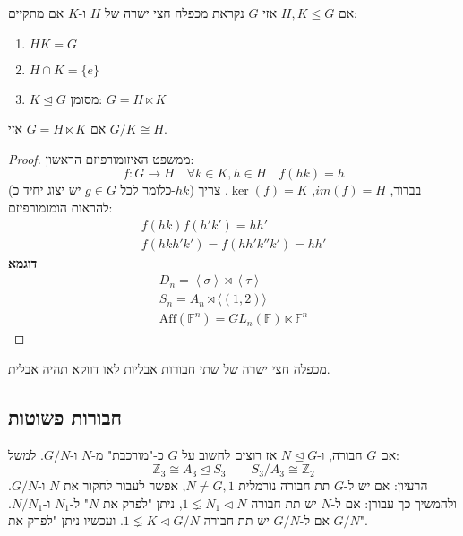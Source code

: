 \documentclass{tstextbook}
\begin{document}
\begin{definition}
אם \(H,K\leq G\) אזי \(G\) נקראת מכפלה חצי ישרה של \(H\) ו-\(K\) אם מתקיים:

  \begin{enumerate}
    \item \(HK=G\)


    \item \(H\cap K=\{ e \}\)


    \item \(K\trianglelefteq G\) 
מסומן: \(G=H\ltimes K\)


  \end{enumerate}
\end{definition}
\begin{proposition}
אם \(G=H\ltimes K\) אזי \(G / K \cong H\).

\end{proposition}
\begin{proof}
ממשפט האיזומורפיזם הראשון:
$$f:G\to H \quad \forall k\in K, h\in H\quad f(hk)=h$$
(כלומר לכל \(g\in G\) יש יצוג יחיד כ-\(hk\)) בברור, \(im(f)=H\), \(\ker(f)=K\). צריך להראות הומומורפיזם: 
$$\begin{gathered}f(hk)f(h'k')=hh'\\f(hkh'k')=f(hh'k''k')=hh'
\end{gathered}$$\textbf{דוגמא}$$\begin{gathered}D_{n}=\left\langle  \sigma \right\rangle\rtimes \left\langle  \tau \right\rangle \\S_{n}=A_{n} \rtimes \langle (1,2)\rangle\\\mathrm{Aff}\left( \mathbb{F}^n  \right)=GL_{n}\left( \mathbb{F} \right)\ltimes \mathbb{F}^n
\end{gathered}$$

\end{proof}
\begin{remark}
מכפלה חצי ישרה של שתי חבורות אבליות לאו דווקא תהיה אבלית.

\end{remark}
\subsection{חבורות פשוטות}

אם \(G\) חבורה, ו-\(N\trianglelefteq G\) אז רוצים לחשוב על \(G\) כ-"מורכבת" מ-\(N\) ו-\(G/N\). למשל:
$$\mathbb{Z} _{3} \cong A_{3}\trianglelefteq S_{3}\qquad S_{3} / A_{3} \cong \mathbb{Z} _{2}$$
הרעיון:
אם יש ל-\(G\) תת חבורה נורמלית \(N\neq G,1\), אפשר לעבור לחקור את \(N\) ו-\(G / N\). ולהמשיך כך עבורן: אם ל-\(N\) יש תת חבורה \(1\lneq N_{1}\triangleleft N\), ניתן "לפרק את \(N\)" ל-\(N_{1}\) ו-\(N / N_{1}\). אם ל-\(G / N\) יש תת חבורה \(1\lneq K \triangleleft G / N\). ועכשיו ניתן "לפרק את \(G / N\)".
\end{document}
